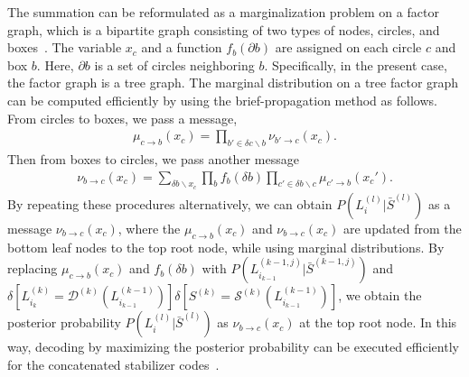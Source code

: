The summation can be reformulated as a marginalization problem on a factor graph, which is a bipartite graph consisting of two types of nodes, circles, and boxes~\cite{Poulin06}.
The variable $x_c$ and a function $f_b(\partial b)$ are assigned on each circle $c$ and box $b$.
Here, $\partial b$ is a set of circles neighboring $b$.
Specifically, in the present case, the factor graph is a tree graph.
The marginal distribution on a tree factor graph can be computed efficiently by using the brief-propagation method as follows.
From circles to boxes, we pass a message,
\begin{eqnarray} 
\mu _{c\rightarrow b}(x_c)= \prod _{b' \in  \delta c \backslash b} \nu _{b'\rightarrow c}(x_c).
\end{eqnarray}
Then from boxes to circles, we pass another message
\begin{eqnarray} 
\nu _{b\rightarrow c}(x_c)= \sum _{\delta b \backslash x_c}\prod _{b} f_{b}(\delta b) \prod _{c'\in \delta b \backslash c} \mu _{c' \rightarrow b}(x_c').
\end{eqnarray}
By repeating these procedures alternatively, we can obtain $P(L_i^{(l)}|\bar S^{(l)})$ as a message $\nu_{b\rightarrow c}(x_c)$, where the $\mu _{c\rightarrow b}(x_c)$ and 
$\nu _{b\rightarrow c}(x_c)$ are updated from the bottom leaf nodes to the top root node, while using marginal distributions.
By replacing $\mu _{c\rightarrow b}(x_c)$ and $f_b(\delta b)$ with $P(L_{i_{k-1}}^{(k-1,j)}| \bar S^{(k-1,j)})$ and 
$\delta [  L_{i_{k}}^{(k)} = \mathcal{D}^{(k)}(L_{i_{k-1}}^{(k-1)}) ] \delta [S^{(k)}= \mathcal{S}^{(k)}(L_{i_{k-1}}^{(k-1)}) ]$, we obtain the posterior probability $P(L_i^{(l)}|\bar S^{(l)})$ as $\nu _{b\rightarrow c}(x_c)$ at the top root node.
In this way, decoding by maximizing the posterior probability can be executed efficiently for the concatenated stabilizer codes~\cite{Poulin06}.